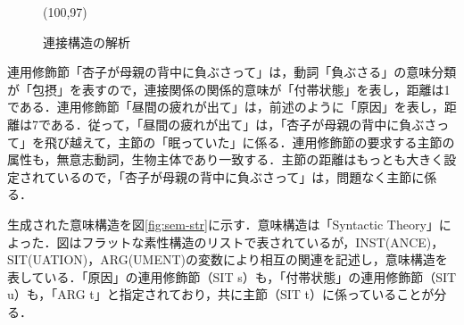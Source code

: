 \begin{figure}
\hspace*{20mm}
\vspace*{-3mm}
\atari(100,97)
\vspace{-3mm}
\caption{連接構造の解析}
\label{fig:coh-str}
\end{figure}

連用修飾節「杏子が母親の背中に負ぶさって」は，動詞「負ぶさる」の意味分類が「包摂」を表すので，連接関係の関係的意味が「付帯状態」を表し，距離は1である．連用修飾節「昼間の疲れが出て」は，前述のように「原因」を表し，距離は7である．従って，「昼間の疲れが出て」は，「杏子が母親の背中に負ぶさって」を飛び越えて，主節の「眠っていた」に係る．連用修飾節の要求する主節の属性も，無意志動詞，生物主体であり一致する．主節の距離はもっとも大きく設定されているので，「杏子が母親の背中に負ぶさって」は，問題なく主節に係る．

生成された意味構造を図\ref{fig:sem-str}に示す．意味構造は「Syntactic Theory」\cite{sag1999}によった．図はフラットな素性構造のリストで表されているが，INST(ANCE)，SIT(UATION)，ARG(UMENT)の変数により相互の関連を記述し，意味構造を表している．「原因」の連用修飾節（SIT s）も，「付帯状態」の連用修飾節（SIT u）も，「ARG t」と指定されており，共に主節（SIT t）に係っていることが分る．

